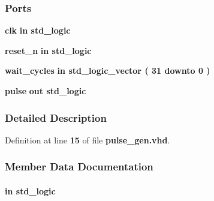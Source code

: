 \subsubsection*{Ports}
 \begin{DoxyCompactItemize}
\item 
{\bf clk}  {\bfseries {\bfseries \textcolor{keywordflow}{in}\textcolor{vhdlchar}{ }}} {\bfseries \textcolor{comment}{std\+\_\+logic}\textcolor{vhdlchar}{ }} 
\item 
{\bf reset\+\_\+n}  {\bfseries {\bfseries \textcolor{keywordflow}{in}\textcolor{vhdlchar}{ }}} {\bfseries \textcolor{comment}{std\+\_\+logic}\textcolor{vhdlchar}{ }} 
\item 
{\bf wait\+\_\+cycles}  {\bfseries {\bfseries \textcolor{keywordflow}{in}\textcolor{vhdlchar}{ }}} {\bfseries \textcolor{comment}{std\+\_\+logic\+\_\+vector}\textcolor{vhdlchar}{ }\textcolor{vhdlchar}{(}\textcolor{vhdlchar}{ }\textcolor{vhdlchar}{ } \textcolor{vhdldigit}{31} \textcolor{vhdlchar}{ }\textcolor{keywordflow}{downto}\textcolor{vhdlchar}{ }\textcolor{vhdlchar}{ } \textcolor{vhdldigit}{0} \textcolor{vhdlchar}{ }\textcolor{vhdlchar}{)}\textcolor{vhdlchar}{ }} 
\item 
{\bf pulse}  {\bfseries {\bfseries \textcolor{keywordflow}{out}\textcolor{vhdlchar}{ }}} {\bfseries \textcolor{comment}{std\+\_\+logic}\textcolor{vhdlchar}{ }} 
\end{DoxyCompactItemize}


\subsubsection{Detailed Description}


Definition at line {\bf 15} of file {\bf pulse\+\_\+gen.\+vhd}.



\subsubsection{Member Data Documentation}
\paragraph[{clk}]{ {\bfseries \textcolor{keywordflow}{in}\textcolor{vhdlchar}{ }} {\bfseries \textcolor{comment}{std\+\_\+logic}\textcolor{vhdlchar}{ }} \hspace{0.3cm}{\ttfamily [Port]}}\label{classpulse__gen_a4a4609c199d30b3adebbeb3a01276ec5}


